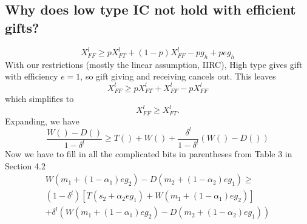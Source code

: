 \documentclass[12pt]{article}
\newcommand{\al}{\alpha}
\newcommand{\de}{\delta}
\begin{document}
\subsection{Why does low type IC not hold with efficient gifts?}
\label{sec:e1}
\begin{equation}
	X_{FF}^l \geq pX_{FT}^l+(1-p)X_{FF}^l-pg_h+peg_h
	\label{eqn:IClow}
\end{equation}
With our restrictions (mostly the linear assumption, IIRC), High type gives gift with efficiency $e=1$, so gift giving and receiving cancels out. This leaves
		$$X_{FF}^l \geq pX_{FT}^l + X_{FF}^l - pX_{FF}^l$$
		which simplifies to 
		$$X_{FF}^l \geq X_{FT}^l.$$
		Expanding, we have
		\[
			\frac{W\left( \right)-D\left( \right)}{1-\de^l} \geq T\left( \right) + W\left( \right) + \frac{\de^l}{1-\de^l}\left(W\left( \right) -D\left( \right) \right)
		\]
		Now we have to fill in all the complicated bits in parentheses from Table 3 in Section 4.2
		\begin{multline}
			W\left(m_1 + \left(1-\al_1\right)eg_2\right)-D\left(m_2 + \left(1-\al_2\right)eg_1\right) \geq \\
			\left(1-\de^l\right) \left[T\left(s_2 + \al_2eg_1\right) + W\left(m_1 + \left(1-\al_1\right)eg_2\right) \right] \\
			+ \de^l \left(W\left(m_1 + \left(1-\al_1\right)eg_2\right)-D\left(m_2 + \left(1-\al_2\right)eg_1\right)\right)
			\label{eq:lowICex}
		\end{multline}
\end{document}
